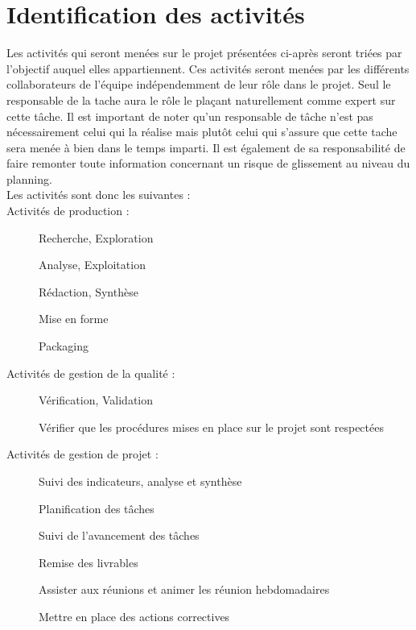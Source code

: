 
\section{Identification des activités}

Les activités qui seront menées sur le projet présentées ci-après seront triées par l’objectif auquel elles appartiennent. Ces activités seront menées par les différents collaborateurs de l’équipe indépendemment    de leur rôle dans le projet. Seul le responsable de la tache aura le rôle le plaçant naturellement comme expert sur cette tâche. Il est important de noter qu’un responsable de tâche n’est pas nécessairement celui qui la réalise mais plutôt celui qui s’assure que cette tache sera menée à bien dans le temps imparti. Il est également de sa responsabilité de faire remonter toute information concernant un risque de glissement au niveau du planning. \\
  
Les activités sont donc les suivantes :\\

Activités de production : \\

\begin{description}
    \item[\textbullet] Recherche, Exploration
    \item[\textbullet] Analyse, Exploitation
    \item[\textbullet] Rédaction, Synthèse
    \item[\textbullet] Mise en forme
    \item[\textbullet] Packaging
\end{description}

Activités de gestion de la qualité : \\

\begin{description}
    \item[\textbullet] Vérification, Validation
    \item[\textbullet] Vérifier que les procédures mises en place sur le projet sont respectées
\end{description}

Activités de gestion de projet : \\

\begin{description}
    \item[\textbullet] Suivi des indicateurs, analyse et synthèse
    \item[\textbullet] Planification des tâches
    \item[\textbullet] Suivi de l’avancement des tâches
    \item[\textbullet] Remise des livrables
    \item[\textbullet] Assister aux réunions et animer les réunion hebdomadaires
    \item[\textbullet] Mettre en place des actions correctives
\end{description}

